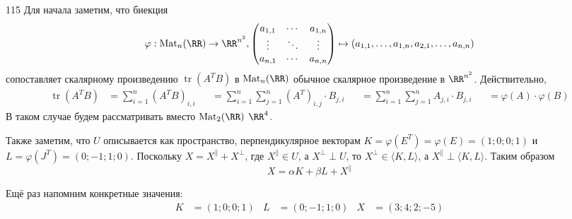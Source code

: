 \documentclass[12pt,a4paper]{article}
\DeclareMathOperator{\tr}{tr}
\begin{document}
    \begin{problem}{115}
        Для начала заметим, что биекция
        \[
            \varphi: \mathrm{Mat}_n(\RR) \to \RR^{n^2},
            \begin{pmatrix}
                a_{1,1}& \cdots& a_{1, n}\\
                \vdots& \ddots& \vdots\\
                a_{n,1}& \cdots& a_{n, n}
            \end{pmatrix}
            \mapsto (a_{1,1}, \ldots, a_{1,n}, a_{2,1}, \ldots, a_{n,n})
        \]
        сопоставляет скалярному произведению $\tr(A^T B)$ в $\mathrm{Mat}_n(\RR)$ обычное скалярное произведение в $\RR^{n^2}$. Действительно,
        \begin{align*}
            \tr(A^T B)
            &= \sum_{i=1}^n (A^T B)_{i, i}&
            &= \sum_{i=1}^n \sum_{j=1}^n (A^T)_{i,j} \cdot B_{j, i}&
            &= \sum_{i=1}^n \sum_{j=1}^n A_{j,i} \cdot B_{j, i}&
            &= \varphi(A) \cdot \varphi(B)
        \end{align*}
        В таком случае будем рассматривать вместо $\mathrm{Mat}_2(\RR)$ $\RR^4$.

        Также заметим, что $U$ описывается как пространство, перпендикулярное векторам $K = \varphi(E^T) = \varphi(E) = (1; 0; 0; 1)$ и $L = \varphi(J^T) = (0; -1; 1; 0)$. Поскольку $X = X^\parallel + X^\perp$, где $X^\parallel \in U$, а $X^\perp \perp U$, то $X^\perp \in \langle K, L \rangle$, а $X^\parallel \perp \langle K, L \rangle$. Таким образом
        \[X = \alpha K + \beta L + X^\parallel\]
        
        Ещё раз напомним конкретные значения:
        \begin{align*}
            K &= (1; 0; 0; 1)&
            L &= (0; -1; 1; 0)&
            X &= (3; 4; 2; -5)
        \end{align*}


\end{problem}
\end{document}
